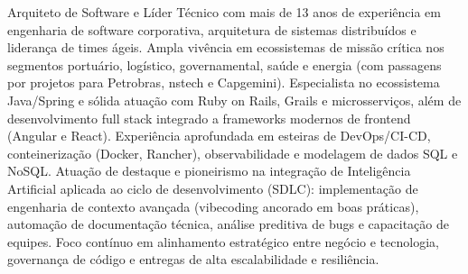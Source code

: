 %
%
%
{
Arquiteto de Software e Líder Técnico com mais de 13 anos de experiência em engenharia de software corporativa, arquitetura de sistemas distribuídos e liderança de times ágeis. Ampla vivência em ecossistemas de missão crítica nos segmentos portuário, logístico, governamental, saúde e energia (com passagens por projetos para Petrobras, nstech e Capgemini). Especialista no ecossistema Java/Spring e sólida atuação com Ruby on Rails, Grails e microsserviços, além de desenvolvimento full stack integrado a frameworks modernos de frontend (Angular e React). Experiência aprofundada em esteiras de DevOps/CI-CD, conteinerização (Docker, Rancher), observabilidade e modelagem de dados SQL e NoSQL. Atuação de destaque e pioneirismo na integração de Inteligência Artificial aplicada ao ciclo de desenvolvimento (SDLC): implementação de engenharia de contexto avançada (vibecoding ancorado em boas práticas), automação de documentação técnica, análise preditiva de bugs e capacitação de equipes. Foco contínuo em alinhamento estratégico entre negócio e tecnologia, governança de código e entregas de alta escalabilidade e resiliência.
}
